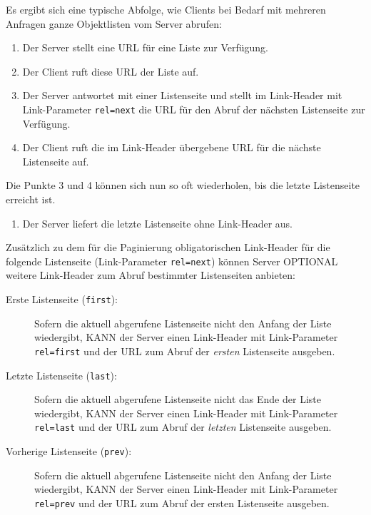 \documentclass[,a4paper]{article}
\begin{document}
Es ergibt sich eine typische Abfolge, wie Clients bei Bedarf mit
mehreren Anfragen ganze Objektlisten vom Server abrufen:

\begin{enumerate}
\def\labelenumi{\arabic{enumi}.}
\item
  Der Server stellt eine URL für eine Liste zur Verfügung.
\item
  Der Client ruft diese URL der Liste auf.
\item
  Der Server antwortet mit einer Listenseite und stellt im Link-Header
  mit Link-Parameter \texttt{rel=next} die URL für den Abruf der
  nächsten Listenseite zur Verfügung.
\item
  Der Client ruft die im Link-Header übergebene URL für die nächste
  Listenseite auf.
\end{enumerate}

Die Punkte 3 und 4 können sich nun so oft wiederholen, bis die letzte
Listenseite erreicht ist.

\begin{enumerate}
\def\labelenumi{\arabic{enumi}.}
\setcounter{enumi}{4}
\itemsep1pt\parskip0pt
\item
  Der Server liefert die letzte Listenseite ohne Link-Header aus.
\end{enumerate}

Zusätzlich zu dem für die Paginierung obligatorischen Link-Header für
die folgende Listenseite (Link-Parameter \texttt{rel=next}) können
Server OPTIONAL weitere Link-Header zum Abruf bestimmter Listenseiten
anbieten:

\begin{description}
\item[Erste Listenseite (\texttt{first}):]
Sofern die aktuell abgerufene Listenseite nicht den Anfang der Liste
wiedergibt, KANN der Server einen Link-Header mit Link-Parameter
\texttt{rel=first} und der URL zum Abruf der \emph{ersten} Listenseite
ausgeben.
\item[Letzte Listenseite (\texttt{last}):]
Sofern die aktuell abgerufene Listenseite nicht das Ende der Liste
wiedergibt, KANN der Server einen Link-Header mit Link-Parameter
\texttt{rel=last} und der URL zum Abruf der \emph{letzten} Listenseite
ausgeben.
\item[Vorherige Listenseite (\texttt{prev}):]
Sofern die aktuell abgerufene Listenseite nicht den Anfang der Liste
wiedergibt, KANN der Server einen Link-Header mit Link-Parameter
\texttt{rel=prev} und der URL zum Abruf der ersten Listenseite ausgeben.
\end{description}
\end{document}
